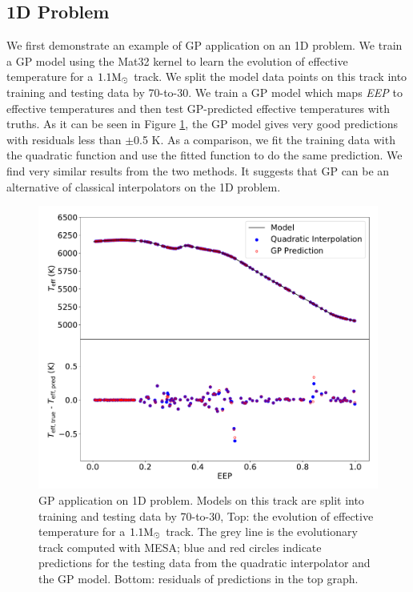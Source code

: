 \subsection{1D Problem}

We first demonstrate an example of GP application on an 1D problem. We train a GP model using the Mat32 kernel to learn the evolution of effective temperature for a $\rm 1.1M_{\odot}$ track. 
%
We split the model data points on this track into training and testing data by 70-to-30. We train a GP model which maps  {\it EEP} to effective temperatures and then test GP-predicted effective temperatures with truths. As it can be seen in Figure \ref{fig:1dgp}, the GP model gives very good predictions with residuals less than $\pm$0.5 K. As a comparison, we fit the training data with the quadratic function and use the fitted function to do the same prediction. We find very similar results from the two methods. It suggests that GP can be an alternative of classical interpolators on the 1D problem. 

\begin{figure}
	\includegraphics[width=1.0\columnwidth]{1d-gp.pdf}
    \caption{GP application on 1D problem. Models on this track are split into training and testing data by 70-to-30, Top: the evolution of effective temperature for a $\rm 1.1M_{\odot}$ track. The grey line is the evolutionary track computed with \textsc{MESA}; blue and red circles indicate predictions for the testing data from the quadratic interpolator and the GP model. Bottom: residuals of predictions in the top graph. }  
    \label{fig:1dgp}
\end{figure}


